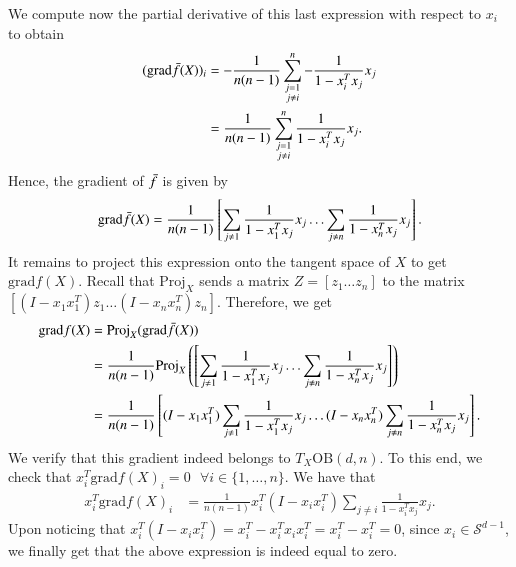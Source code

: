 \documentclass{article}
\begin{document}
We compute now the partial derivative of this last expression with respect to $x_i$ to obtain
\begin{align*}
    (\text{grad}\Bar{f}(X))_i &= -\frac{1}{n(n-1)}\sum_{\substack{j=1\\j\neq i}}^n -\frac{1}{1-x_i^Tx_j}x_j\\
    &= \frac{1}{n(n-1)}\sum_{\substack{j=1\\j\neq i}}^n \frac{1}{1-x_i^Tx_j}x_j.
\end{align*}
Hence, the gradient of $\Bar{f}$ is given by
$$
\text{grad}\Bar{f}(X) = \frac{1}{n(n-1)}
\left[ \sum_{j\neq 1} \frac{1}{1-x_1^Tx_j}x_j \ldots \sum_{j\neq n}\frac{1}{1-x_n^Tx_j}x_j \right].
$$
It remains to project this expression onto the tangent space of $X$ to get $\text{grad}f(X)$. Recall that $\text{Proj}_X$ sends a matrix $Z=[z_1 \ldots z_n]$ to the matrix $\left[ (I-x_1x_1^T)z_1 \ldots (I-x_nx_n^T)z_n \right]$. Therefore, we get
\begin{align*}
    \text{grad}f(X) &= \text{Proj}_X(\text{grad}\Bar{f}(X))\\
                    &= \frac{1}{n(n-1)}\text{Proj}_X\left( \left[ \sum_{j\neq 1}\frac{1}{1-x_1^Tx_j}x_j \ldots \sum_{j\neq n}\frac{1}{1-x_n^Tx_j}x_j\right]\right)\\
                    &= \frac{1}{n(n-1)} \left[ (I-x_1x_1^T)\sum_{j\neq 1}\frac{1}{1-x_1^Tx_j}x_j \ldots (I-x_nx_n^T)\sum_{j\neq n}\frac{1}{1-x_n^Tx_j}x_j\right].
\end{align*}
We verify that this gradient indeed belongs to $T_X\text{OB}(d, n)$. To this end, we check that $x_i^T\text{grad}f(X)_i=0\text{ }\forall i \in\{1, \ldots, n\}$. We have that
\begin{align*}
    x_i^T\text{grad}f(X)_i &= \frac{1}{n(n-1)}x_i^T(I-x_ix_i^T)\sum_{j\neq i}\frac{1}{1-x_i^Tx_j}x_j.
\end{align*}
Upon noticing that $x_i^T(I-x_ix_i^T) = x_i^T-x_i^Tx_ix_i^T = x_i^T - x_i^T = 0$, since $x_i\in\mathcal{S}^{d-1}$, we finally get that the above expression is indeed equal to zero.
\end{document}
